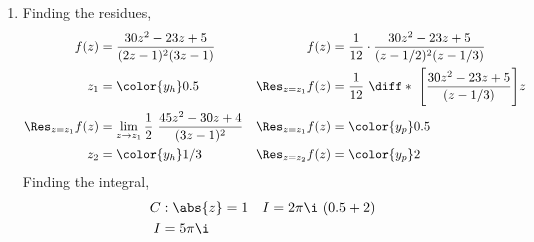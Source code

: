 \begin{enumerate}
    \item Finding the residues,
          \begin{align}
              f(z)                & = \frac{30z^2 - 23z + 5}{(2z-1)^2(3z-1)} &
              f(z)                & = \frac{1}{12} \cdot
              \frac{30z^2 - 23z + 5}{(z - 1/2)^2(z - 1/3)}                     \\
              z_1                 & = \color{y_h} 0.5                        &
              \Res_{z = z_1} f(z) & = \frac{1}{12}\ \diff*{\ \Bigg[
              \frac{30z^2 - 23z + 5}{(z - 1/3)} \Bigg]}{z}                     \\
              \Res_{z = z_1} f(z) & = \lim_{z \to z_1} \frac{1}{2}
              \ \frac{45z^2 - 30z + 4}
              {(3z - 1)^2}        &
              \Res_{z = z_1} f(z) & = \color{y_p} 0.5                          \\
              z_2                 & = \color{y_h} 1/3                        &
              \Res_{z = z_2} f(z) & = \color{y_p} 2
          \end{align}
          Finding the integral,
          \begin{align}
              C & : \abs{z} =  1      &
              I & = 2\pi\i\ (0.5 + 2)   \\
              I & = 5\pi\i
          \end{align}


\end{enumerate}

